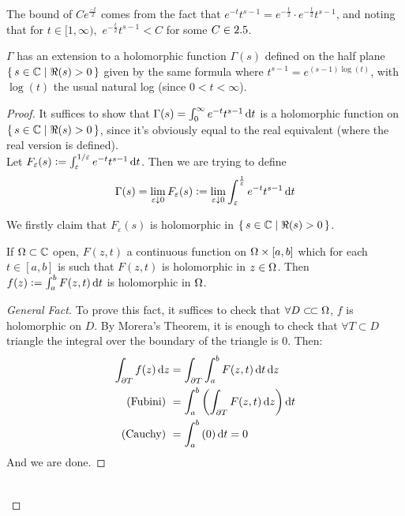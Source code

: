 \begin{note}
The bound of $C e^{\frac{-t}{2}}$ comes from the fact that $e^{-t} t^{s-1} = e^{-\frac{t}{2}} \cdot e^{-\frac{t}{2}} t^{s-1}$, and noting that for $t \in [1,\infty),$ $e^{-\frac{t}{2}} t^{s-1} < C$ for some $C \in 2.5$.
\end{note}


\begin{proposition}
$\Gamma$ has an extension to a holomorphic function $\Gamma(s)$ defined on the half plane $\set{ s \in \mathbb{C}\mid \Re(s) > 0}$ given by the same formula where $t^{s-1} = e^{(s-1) \log(t)}$, with $\log(t)$ the usual natural log (since $0 < t < \infty$).
\end{proposition}

\begin{proof}
It suffices to show that $\Gamma(s) = \int_0^\infty e^{-t} t^{s-1} \dif t$ is a holomorphic function on $\set{ s \in \mathbb{C}\mid \Re(s) > 0}$, since it's obviously equal to the real equivalent (where the real version is defined).\\

Let $F_\varepsilon (s) \defas \int_\varepsilon^{1/\varepsilon} e^{-t} t^{s-1} \dif t  $. Then we are trying to define
\begin{align*}
 \Gamma(s) = \lim_{\varepsilon \downarrow 0} F_\varepsilon (s) \defas \lim_{\varepsilon \downarrow 0} \int_\varepsilon^\frac{1}{\varepsilon} e^{-t} t^{s-1} \dif t   
\end{align*}

We firstly claim that $F_\varepsilon(s)$ is holomorphic in $\set{ s \in \mathbb{C}\mid \Re(s) > 0}$.\\


\begin{lemma}
If $\Omega \subset \mathbb{C}$ open, $F(z,t)$ a continuous function on $\Omega \times [a,b]$ which for each $t \in [a,b]$ is such that $F(z,t)$ is holomorphic in $z \in \Omega$. Then $f(z) \defas \int_a^b F(z,t) \dif t$ is holomorphic in $\Omega$.

\end{lemma}


\begin{proof}[General Fact]
To prove this fact, it suffices to check that $\forall D \ssubset \om$, $f$ is holomorphic on $D$. By Morera's Theorem, it is enough to check that $\forall T \subset D$ triangle the integral over the boundary of the triangle is $0$. Then:
\begin{align*}
    \int_{\partial T} f(z) \dif z &= \int_{\partial T} \int_a^b F(z,t) \dif t \dif z\\
    \text{(Fubini) } &=  \int_a^b \br{ \int_{\partial T} F(z,t) \dif z } \dif t \\
    \text{(Cauchy) } &= \int_a^b \br{0} \dif t = 0
\end{align*}
And we are done.
\end{proof}\\


\end{proof}
